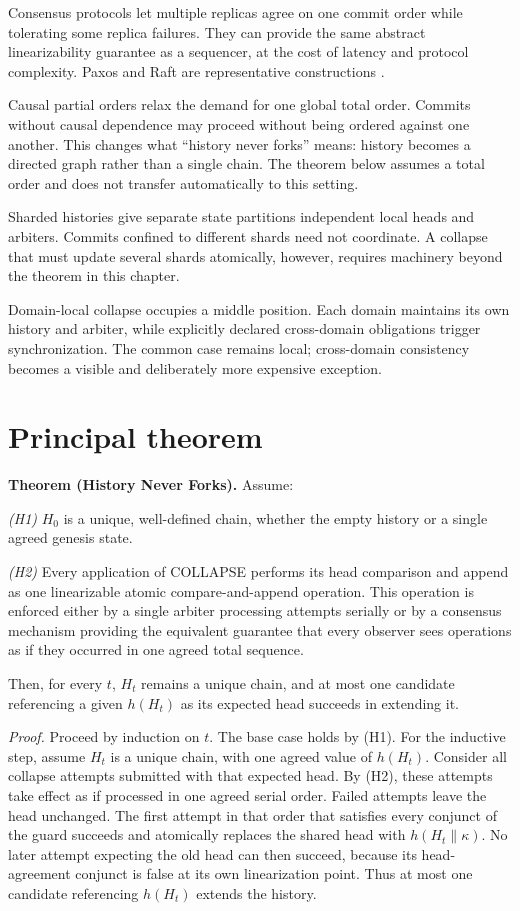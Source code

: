 \documentclass[11pt,openany]{book}
\begin{document}
Consensus protocols let multiple replicas agree on one commit order while
tolerating some replica failures. They can provide the same abstract
linearizability guarantee as a sequencer, at the cost of latency and protocol
complexity. Paxos and Raft are representative constructions
\cite{lamport-paxos,ongaro-raft}.

Causal partial orders relax the demand for one global total order. Commits
without causal dependence may proceed without being ordered against one
another. This changes what ``history never forks'' means: history becomes a
directed graph rather than a single chain. The theorem below assumes a total
order and does not transfer automatically to this setting.

Sharded histories give separate state partitions independent local heads and
arbiters. Commits confined to different shards need not coordinate. A collapse
that must update several shards atomically, however, requires machinery beyond
the theorem in this chapter.

Domain-local collapse occupies a middle position. Each domain maintains its
own history and arbiter, while explicitly declared cross-domain obligations
trigger synchronization. The common case remains local; cross-domain
consistency becomes a visible and deliberately more expensive exception.

\section{Principal theorem}
\textbf{Theorem (History Never Forks).} Assume:

\emph{(H1)} \(H_0\) is a unique, well-defined chain, whether the empty history
or a single agreed genesis state.

\emph{(H2)} Every application of COLLAPSE performs its head comparison and
append as one linearizable atomic compare-and-append operation. This operation
is enforced either by a single arbiter processing attempts serially or by a
consensus mechanism providing the equivalent guarantee that every observer
sees operations as if they occurred in one agreed total sequence.

Then, for every \(t\), \(H_t\) remains a unique chain, and at most one candidate
referencing a given \(h(H_t)\) as its expected head succeeds in extending it.

\emph{Proof.} Proceed by induction on \(t\). The base case holds by (H1). For
the inductive step, assume \(H_t\) is a unique chain, with one agreed value of
\(h(H_t)\). Consider all collapse attempts submitted with that expected head.
By (H2), these attempts take effect as if processed in one agreed serial order.
Failed attempts leave the head unchanged. The first attempt in that order that
satisfies every conjunct of the guard succeeds and atomically replaces the
shared head with \(h(H_t\mathbin{\|}\kappa)\). No later attempt expecting the
old head can then succeed, because its head-agreement conjunct is false at its
own linearization point. Thus at most one candidate referencing \(h(H_t)\)
extends the history.
\end{document}
